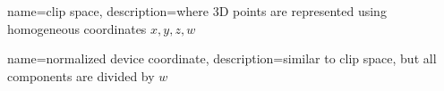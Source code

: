 {
  name=clip space,
  description={where 3D points are represented using homogeneous
  coordinates $ x, y, z, w $}
}

{
  name={normalized device coordinate},
  description={similar to clip space, but all components are divided by $ w $}
}

